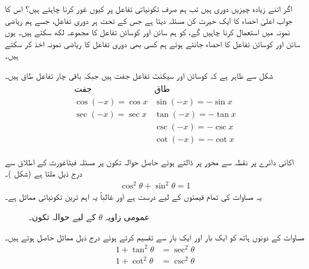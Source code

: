 اگر اتنے زیادہ چیزیں دوری ہیں تب ہم صرف تکونیاتی تفاعل پر کیوں غور کرنا چاہتے ہیں؟ اس کا جواب اعلیٰ احصاء کا ایک حیرت کن مسئلہ دیتا ہے جس کے تحت ہر دوری تفاعل، جسے ہم ریاضی نمونہ میں استعمال کرنا چاہیں گے، کو ہم سائن اور کوسائن تفاعل کا مجموعہ لکھ سکتے ہیں۔  یوں سائن اور کوسائن تفاعل کا احصاء جانتے ہوئے ہم کسی بھی دوری تفاعل کا ریاضی نمونہ اخذ کر سکتے ہیں۔

شکل  سے ظاہر ہے کہ کوسائن اور سیکنٹ تفاعل جفت ہیں جبکہ باقی چار تفاعل طاق ہیں۔
\begin{align*}
\begin{array}{ll}
\text{جفت}&\text{طاق}\\
\hline
\cos(-x)=\cos x &\sin(-x)=-\sin x\\
\sec(-x)=\sec x&\tan(-x)=-\tan x\\
&\csc(-x)=-\csc x\\
&\cot(-x)=-\cot x
\end{array}
\end{align*}

اکائی دائرے پر نقطہ  سے محور  پر  ڈالتے  ہوئے حاصل حوالہ تکون پر مسئلہ فیثاغورث کے اطلاق سے درج ذیل ملتا ہے (شکل )۔
\begin{align}\label{مساوات_ابتدا_مماثل_الف}
\cos^2\theta +\sin^2\theta=1
\end{align}
یہ مساوات  کی تمام قیمتوں  کے لیے درست ہے اور غالباً  یہ اہم ترین تکونیاتی مماثل ہے۔
\begin{figure}
\centering
{}
\caption{عمومی زاویہ $\theta$ کے لیے حوالہ تکون۔}
\label{شکل_ابتدا_عمومی_زاویہ_تکون}
\end{figure}

مساوات  کے دونوں ہاتھ کو ایک بار  اور ایک بار  سے تقسیم کرتے ہوئے درج ذیل مماثل حاصل ہوتے ہیں۔
\begin{align*}
1+\tan^2\theta&=\sec^2\theta\\
1+\cot^2\theta&=\csc^2\theta
\end{align*}


